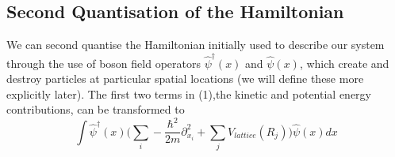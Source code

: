\documentclass[a4paper,10pt]{article}
\begin{document}
\subsection{Second Quantisation of the Hamiltonian}
We can second quantise the Hamiltonian initially used to describe our system through the use of boson field operators $\hat{\psi}^{\dagger}(x)$ and $\hat{\psi}(x)$, which create and destroy 
particles at particular spatial locations (we will define these more explicitly later). The first two terms in (1),the kinetic 
and potential energy contributions, can be transformed to 
\begin{equation}
 \int  \hat{\psi}^{\dagger}(x) \bigg(  \sum_{i}-\frac{\hbar^{2}}{2m}  \partial_{x_{i}}^2+\sum_{j}V_{lattice}(R_{j})  \bigg)    \hat{\psi}(x)dx
\end{equation}
\end{document}

